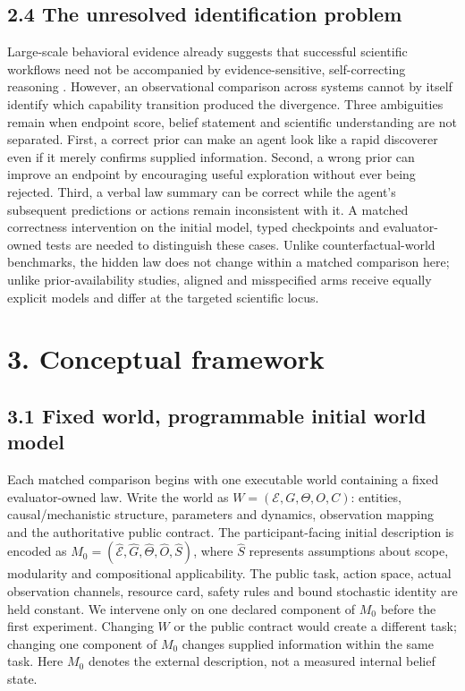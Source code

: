 \documentclass[10pt,twocolumn]{article}
\begin{document}
\subsection{2.4 The unresolved identification
problem}\label{the-unresolved-identification-problem}

Large-scale behavioral evidence already suggests that successful
scientific workflows need not be accompanied by evidence-sensitive,
self-correcting reasoning \citep{riosgarcia2026scientifically}. However,
an observational comparison across systems cannot by itself identify
which capability transition produced the divergence. Three ambiguities
remain when endpoint score, belief statement and scientific
understanding are not separated. First, a correct prior can make an
agent look like a rapid discoverer even if it merely confirms supplied
information. Second, a wrong prior can improve an endpoint by
encouraging useful exploration without ever being rejected. Third, a
verbal law summary can be correct while the agent's subsequent
predictions or actions remain inconsistent with it. A matched
correctness intervention on the initial model, typed checkpoints and
evaluator-owned tests are needed to distinguish these cases. Unlike
counterfactual-world benchmarks, the hidden law does not change within a
matched comparison here; unlike prior-availability studies, aligned and
misspecified arms receive equally explicit models and differ at the
targeted scientific locus.

\section{3. Conceptual framework}\label{conceptual-framework}

\subsection{3.1 Fixed world, programmable initial world
model}\label{fixed-world-programmable-initial-world-model}

Each matched comparison begins with one executable world containing a
fixed evaluator-owned law. Write the world as
\(W=(\mathcal{E},G,\Theta,O,C)\): entities, causal/mechanistic
structure, parameters and dynamics, observation mapping and the
authoritative public contract. The participant-facing initial
description is encoded as
\(M_0=(\widehat{\mathcal{E}},\widehat{G},\widehat{\Theta},\widehat{O},\widehat{S})\),
where \(\widehat{S}\) represents assumptions about scope, modularity and
compositional applicability. The public task, action space, actual
observation channels, resource card, safety rules and bound stochastic
identity are held constant. We intervene only on one declared component
of \(M_0\) before the first experiment. Changing \(W\) or the public
contract would create a different task; changing one component of
\(M_0\) changes supplied information within the same task. Here \(M_0\)
denotes the external description, not a measured internal belief state.
\end{document}
